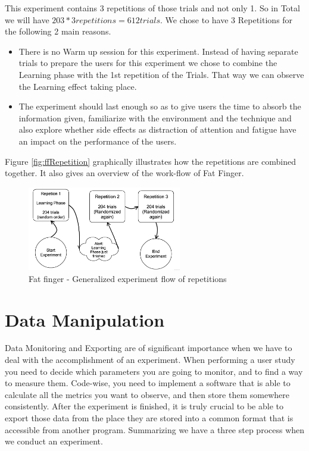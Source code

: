 This experiment contains 3 repetitions of those trials and not only 1. So in Total we will have $203*3repetitions = 612 trials$. We chose to have 3 Repetitions for the following 2 main reasons. 

\begin{itemize}
	\item There is no Warm up session for this experiment. Instead of having separate trials to prepare the users for this experiment we chose to combine the Learning phase with the 1st repetition of the Trials. That way we can observe the Learning effect taking place. 

	\item The experiment should last enough so as to give users the time to absorb the information given, familiarize with the environment and the technique and also explore whether side effects as distraction of attention and fatigue have an impact on the performance of the users.
\end{itemize}

Figure \ref{fig:ffRepetition} graphically illustrates how the repetitions are combined together. It also gives an overview of the work-flow of Fat Finger.

\begin{figure}[H]
\centering
\includegraphics[width=0.6\textwidth]{figures/ffRepetitions.png}
\caption{Fat finger - Generalized experiment flow of repetitions}
\label{fig:ffRepetitions}
\end{figure}


\section{Data Manipulation}

Data Monitoring and Exporting are of significant importance when we have to deal with the accomplishment of an experiment. When performing a user study you need to decide which parameters you are going to monitor, and to find a way to measure them. Code-wise, you need to implement a software that is able to calculate all the metrics you want to observe, and then store them somewhere consistently. After the experiment is finished, it is truly crucial to be able to export those data from the place they are stored into a common format that is accessible from another program. Summarizing we have a three step process when we conduct an experiment. 

